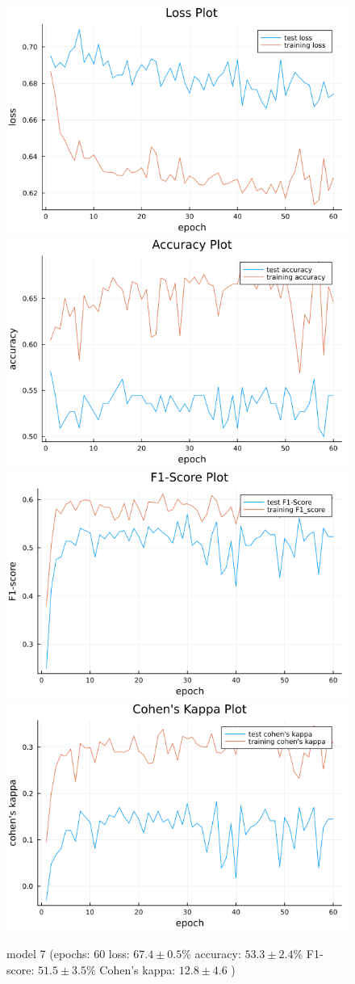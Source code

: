 \documentclass[
a4paper, 
12pt,
grayscalebody, %
abstract=on,
twoside, BCOR10mm, 12pt, DIV13,headinclude, footexclude, final, abstracton, openright
]{ibireprt}
\numberwithin{equation}{chapter}
\numberwithin{table}{chapter}
\numberwithin{figure}{chapter}
\numberwithin{algorithm}{chapter}
\numberwithin{example}{chapter}
\numberwithin{example}{chapter}
\begin{document}
\begin{figure}[h]
	\includegraphics[width=0.4\linewidth]{loss_png_final_2_3.png}\hfill
	\includegraphics[width=0.4\linewidth]{accuracy_png_final_2_3.png}
	\\[\smallskipamount]
	\includegraphics[width=0.4\linewidth]{f1_score_png_final_2_3.png}\hfill
	\includegraphics[width=0.4\linewidth]{cohens_kappa_png_final_2_3.png}
	\caption{model 7 (epochs: 60 loss: $67.4\pm0.5\% $ accuracy: $53.3\pm2.4\%$ F1-score: $51.5\pm3.5\%$  Cohen's kappa: $12.8\pm4.6$ )}
\end{figure}
\end{document}
